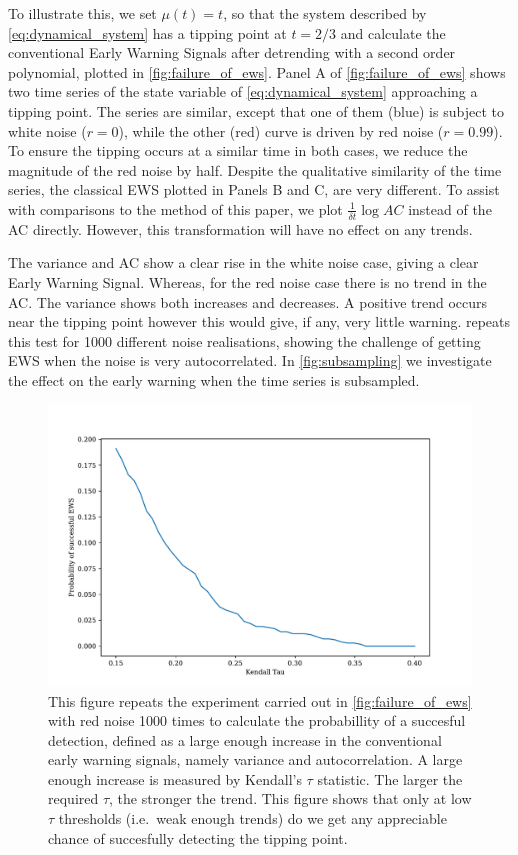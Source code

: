 To illustrate this, we set $\mu(t) = t$, so that the system described by \cref{eq:dynamical_system} has
a tipping point at $t=2/3$ and calculate the conventional Early 
Warning Signals after detrending with a second order polynomial, plotted in \cref{fig:failure_of_ews}.
Panel A of \cref{fig:failure_of_ews} shows two time series of the 
state variable of \cref{eq:dynamical_system} approaching a tipping point.
The series are similar, except that one of them (blue) is subject to white noise ($r = 0$), 
while the other (red) curve is driven by red noise ($r = 0.99$). To
ensure the tipping occurs at a similar time in both
cases, we reduce the magnitude of the red noise by half.
Despite the qualitative similarity of the time series,
the classical EWS plotted in Panels B and C, are very different. To assist with comparisons to the method of this paper, we
plot $\frac{1}{\delta t}\log AC$ instead of the AC directly. However, this
transformation will have no effect on any trends.

The variance and AC show a clear rise in
the white noise case, giving a clear Early Warning Signal. 
Whereas, for the red noise case there is no trend in the AC. The 
variance shows both increases and decreases. A positive trend occurs near
the tipping point however this would give, if any, very little warning. 
repeats this test for 1000 different noise realisations, showing the
challenge of getting EWS when the noise is very 
autocorrelated. In \cref{fig:subsampling} we investigate the effect on the early warning when the time series
is subsampled.

\begin{figure}
  \centering
  \includegraphics[width=\textwidth]{pofsuccess}
  \caption[Probability of detection for conventional EWS]{This figure repeats the experiment carried out in \cref{fig:failure_of_ews}
    with red noise 1000 times to calculate the probabillity of a succesful detection, defined as a large enough increase in the conventional
    early warning signals, namely variance and autocorrelation. A large enough increase is measured by Kendall's $\tau$ statistic. The larger the
    required $\tau$, the stronger the trend. This figure shows that only at low $\tau$ thresholds (i.e.\ weak enough trends) do we get any appreciable
  chance of succesfully detecting the tipping point.}
  \label{fig:prob_of_suc}
\end{figure}


